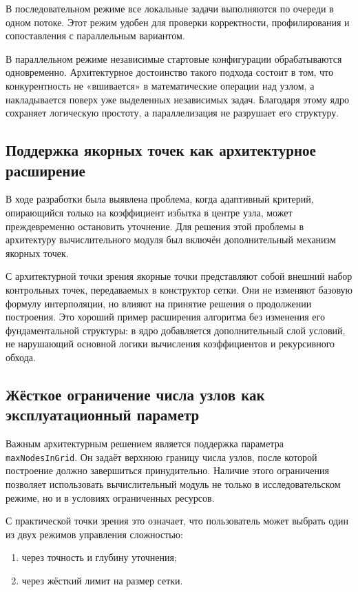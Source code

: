 В последовательном режиме все локальные задачи выполняются по очереди в одном потоке. Этот режим удобен для проверки корректности, профилирования и сопоставления с параллельным вариантом.

В параллельном режиме независимые стартовые конфигурации обрабатываются одновременно. Архитектурное достоинство такого подхода состоит в том, что конкурентность не «вшивается» в математические операции над узлом, а накладывается поверх уже выделенных независимых задач. Благодаря этому ядро сохраняет логическую простоту, а параллелизация не разрушает его структуру.

\subsection{Поддержка якорных точек как архитектурное расширение}

В ходе разработки была выявлена проблема, когда адаптивный критерий, опирающийся только на коэффициент избытка в центре узла, может преждевременно остановить уточнение. Для решения этой проблемы в архитектуру вычислительного модуля был включён дополнительный механизм якорных точек.

С архитектурной точки зрения якорные точки представляют собой внешний набор контрольных точек, передаваемых в конструктор сетки. Они не изменяют базовую формулу интерполяции, но влияют на принятие решения о продолжении построения. Это хороший пример расширения алгоритма без изменения его фундаментальной структуры: в ядро добавляется дополнительный слой условий, не нарушающий основной логики вычисления коэффициентов и рекурсивного обхода.

\subsection{Жёсткое ограничение числа узлов как эксплуатационный параметр}

Важным архитектурным решением является поддержка параметра \texttt{maxNodesInGrid}. Он задаёт верхнюю границу числа узлов, после которой построение должно завершиться принудительно. Наличие этого ограничения позволяет использовать вычислительный модуль не только в исследовательском режиме, но и в условиях ограниченных ресурсов.

С практической точки зрения это означает, что пользователь может выбрать один из двух режимов управления сложностью:
\begin{enumerate}
    \item через точность и глубину уточнения;
    \item через жёсткий лимит на размер сетки.
\end{enumerate}

